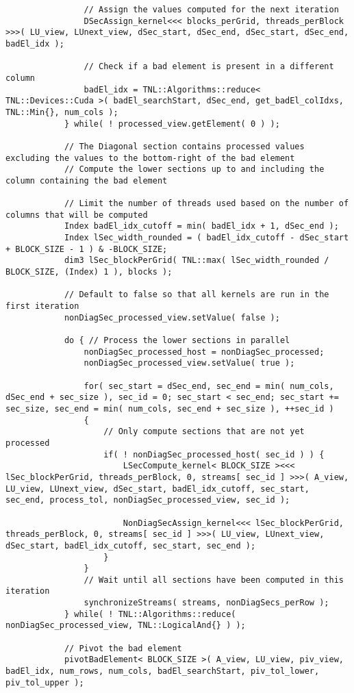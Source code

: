 \begin{lstlisting}
				// Assign the values computed for the next iteration
				DSecAssign_kernel<<< blocks_perGrid, threads_perBlock >>>( LU_view, LUnext_view, dSec_start, dSec_end, dSec_start, dSec_end, badEl_idx );
				
				// Check if a bad element is present in a different column
				badEl_idx = TNL::Algorithms::reduce< TNL::Devices::Cuda >( badEl_searchStart, dSec_end, get_badEl_colIdxs, TNL::Min{}, num_cols );
			} while( ! processed_view.getElement( 0 ) );
			
			// The Diagonal section contains processed values excluding the values to the bottom-right of the bad element
			// Compute the lower sections up to and including the column containing the bad element
			
			// Limit the number of threads used based on the number of columns that will be computed
			Index badEl_idx_cutoff = min( badEl_idx + 1, dSec_end );
			Index lSec_width_rounded = ( badEl_idx_cutoff - dSec_start + BLOCK_SIZE - 1 ) & -BLOCK_SIZE;
			dim3 lSec_blockPerGrid( TNL::max( lSec_width_rounded / BLOCK_SIZE, (Index) 1 ), blocks );
			
			// Default to false so that all kernels are run in the first iteration
			nonDiagSec_processed_view.setValue( false );
			
			do { // Process the lower sections in parallel
				nonDiagSec_processed_host = nonDiagSec_processed;
				nonDiagSec_processed_view.setValue( true );
				
				for( sec_start = dSec_end, sec_end = min( num_cols, dSec_end + sec_size ), sec_id = 0; sec_start < sec_end; sec_start += sec_size, sec_end = min( num_cols, sec_end + sec_size ), ++sec_id )
				{
					// Only compute sections that are not yet processed
					if( ! nonDiagSec_processed_host( sec_id ) ) {
						LSecCompute_kernel< BLOCK_SIZE ><<< lSec_blockPerGrid, threads_perBlock, 0, streams[ sec_id ] >>>( A_view, LU_view, LUnext_view, dSec_start, badEl_idx_cutoff, sec_start, sec_end, process_tol, nonDiagSec_processed_view, sec_id );
						
						NonDiagSecAssign_kernel<<< lSec_blockPerGrid, threads_perBlock, 0, streams[ sec_id ] >>>( LU_view, LUnext_view, dSec_start, badEl_idx_cutoff, sec_start, sec_end );
					}
				}
				// Wait until all sections have been computed in this iteration
				synchronizeStreams( streams, nonDiagSecs_perRow );
			} while( ! TNL::Algorithms::reduce( nonDiagSec_processed_view, TNL::LogicalAnd{} ) );
			
			// Pivot the bad element
			pivotBadElement< BLOCK_SIZE >( A_view, LU_view, piv_view, badEl_idx, num_rows, num_cols, badEl_searchStart, piv_tol_lower, piv_tol_upper );
			

\end{lstlisting}
